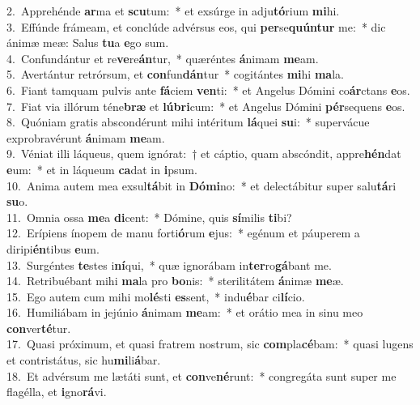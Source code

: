 {2.~}Apprehénde \textbf{ar}ma et \textbf{scu}tum:~* et exsúrge in adju\textbf{tó}rium \textbf{mi}hi.\\
{3.~}Effúnde frámeam, et conclúde advérsus eos, qui \textbf{per}se\textbf{quún}\textbf{tur} me:~* dic ánimæ meæ: Salus \textbf{tu}a \textbf{e}go sum.\\
{4.~}Confundántur et re\textbf{ve}re\textbf{án}tur,~* quæréntes \textbf{á}nimam \textbf{me}am.\\
{5.~}Avertántur retrórsum, et \textbf{con}fun\textbf{dán}tur~* cogitántes \textbf{mi}hi \textbf{ma}la.\\
{6.~}Fiant tamquam pulvis ante \textbf{fá}ciem \textbf{ven}ti:~* et Angelus Dómini co\textbf{ár}ctans \textbf{e}os.\\
{7.~}Fiat via illórum téne\textbf{bræ} et \textbf{lú}\textbf{bri}cum:~* et Angelus Dómini \textbf{pér}sequens \textbf{e}os.\\
{8.~}Quóniam gratis abscondérunt mihi intéritum \textbf{lá}quei \textbf{su}i:~* supervácue exprobravérunt \textbf{á}nimam \textbf{me}am.\\
{9.~}Véniat illi láqueus, quem ignórat:~† et cáptio, quam abscóndit, appre\textbf{hén}dat \textbf{e}um:~* et in láqueum \textbf{ca}dat in \textbf{i}psum.\\
{10.~}Anima autem mea exsul\textbf{tá}bit in \textbf{Dó}\textbf{mi}no:~* et delectábitur super salu\textbf{tá}ri \textbf{su}o.\\
{11.~}Omnia ossa \textbf{me}a \textbf{di}cent:~* Dómine, quis \textbf{sí}milis \textbf{ti}bi?\\
{12.~}Erípiens ínopem de manu forti\textbf{ó}rum \textbf{e}jus:~* egénum et páuperem a diripi\textbf{én}tibus \textbf{e}um.\\
{13.~}Surgéntes \textbf{te}stes i\textbf{ní}qui,~* quæ ignorábam in\textbf{ter}ro\textbf{gá}bant me.\\
{14.~}Retribuébant mihi \textbf{ma}la pro \textbf{bo}nis:~* sterilitátem \textbf{á}nimæ \textbf{me}æ.\\
{15.~}Ego autem cum mihi mo\textbf{lé}sti \textbf{es}sent,~* indu\textbf{é}bar ci\textbf{lí}cio.\\
{16.~}Humiliábam in jejúnio \textbf{á}nimam \textbf{me}am:~* et orátio mea in sinu meo \textbf{con}ver\textbf{té}tur.\\
{17.~}Quasi próximum, et quasi fratrem nostrum, sic \textbf{com}pla\textbf{cé}bam:~* quasi lugens et contristátus, sic hu\textbf{mi}li\textbf{á}bar.\\
{18.~}Et advérsum me lætáti sunt, et \textbf{con}ve\textbf{né}runt:~* congregáta sunt super me flagélla, et \textbf{i}gno\textbf{rá}vi.\\
